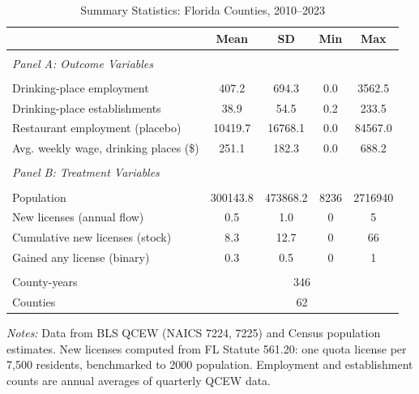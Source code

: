 \begin{table}[htbp]
\centering
\caption{Summary Statistics: Florida Counties, 2010--2023}
\label{tab:sumstats}
\begin{tabular}{lcccc}
\hline\hline
 & Mean & SD & Min & Max \\
\hline
\\[-1.8ex]
\multicolumn{5}{l}{\textit{Panel A: Outcome Variables}} \\
\\[-1.8ex]
Drinking-place employment & 407.2 & 694.3 & 0.0 & 3562.5 \\
Drinking-place establishments & 38.9 & 54.5 & 0.2 & 233.5 \\
Restaurant employment (placebo) & 10419.7 & 16768.1 & 0.0 & 84567.0 \\
Avg. weekly wage, drinking places (\$) & 251.1 & 182.3 & 0.0 & 688.2 \\
\\[-1.8ex]
\multicolumn{5}{l}{\textit{Panel B: Treatment Variables}} \\
\\[-1.8ex]
Population & 300143.8 & 473868.2 & 8236 & 2716940 \\
New licenses (annual flow) & 0.5 & 1.0 & 0 & 5 \\
Cumulative new licenses (stock) & 8.3 & 12.7 & 0 & 66 \\
Gained any license (binary) & 0.3 & 0.5 & 0 & 1 \\
\\[-1.8ex]
\hline
County-years & \multicolumn{4}{c}{346} \\
Counties & \multicolumn{4}{c}{62} \\
\hline\hline
\end{tabular}
\begin{tablenotes}
\small
\item \textit{Notes:} Data from BLS QCEW (NAICS 7224, 7225) and Census population estimates. New licenses computed from FL Statute 561.20: one quota license per 7,500 residents, benchmarked to 2000 population. Employment and establishment counts are annual averages of quarterly QCEW data.
\end{tablenotes}
\end{table}
